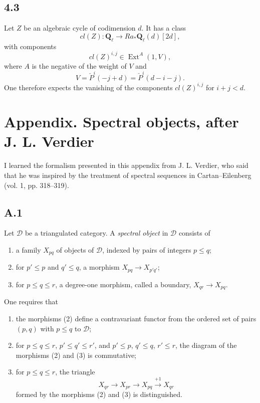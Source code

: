 \documentclass[11pt,a4paper]{article}
\theoremstyle{plain}
\theoremstyle{definition}
\theoremstyle{remark}
\DeclareMathOperator{\Ext}{Ext}
\newcommand{\cD}{\mathscr{D}}
\newcommand{\bQ}{\mathbf{Q}}
\begin{document}
\subsection*{4.3}
Let $Z$ be an algebraic cycle of codimension $d$. It has a class
\[
cl(Z)\colon \bQ_\ell\to Ra_*\bQ_\ell(d)[2d],
\]
with components
\[
cl(Z)^{i,j}\in\Ext^A(1,V),
\]
where $A$ is the negative of the weight of $V$ and
\[
V=\check P^i(-j+d)=\check P^i(d-i-j).
\]
One therefore expects the vanishing of the components $cl(Z)^{i,j}$ for $i+j<d$.

\appendix
\section*{Appendix. Spectral objects, after J. L. Verdier}

I learned the formalism presented in this appendix from J. L. Verdier, who said that he was inspired by the treatment of spectral sequences in Cartan--Eilenberg (vol. 1, pp. 318--319).

\subsection*{A.1}
Let $\cD$ be a triangulated category. A \emph{spectral object} in $\cD$ consists of
\begin{enumerate}[label=(\arabic*)]
\item a family $X_{pq}$ of objects of $\cD$, indexed by pairs of integers $p\leqslant q$;
\item for $p'\leqslant p$ and $q'\leqslant q$, a morphism $X_{pq}\to X_{p'q'}$;
\item for $p\leqslant q\leqslant r$, a degree-one morphism, called a boundary, $X_{qr}\to X_{pq}$.
\end{enumerate}
One requires that
\begin{enumerate}[label=(\alph*)]
\item the morphisms (2) define a contravariant functor from the ordered set of pairs $(p,q)$ with $p\leqslant q$ to $\cD$;
\item for $p\leqslant q\leqslant r$, $p'\leqslant q'\leqslant r'$, and $p'\leqslant p$, $q'\leqslant q$, $r'\leqslant r$, the diagram of the morphisms (2) and (3) is commutative;
\item for $p\leqslant q\leqslant r$, the triangle
\[
X_{qr}\to X_{pr}\to X_{pq}\xrightarrow{+1}X_{qr}
\]
formed by the morphisms (2) and (3) is distinguished.
\end{enumerate}
\end{document}
